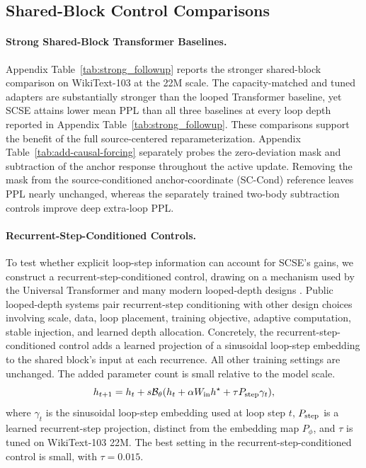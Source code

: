 \documentclass[letterpaper]{article} %
\newcommand{\SCSE}{\textsc{SCSE}}
\newcommand{\Block}{\mathcal{B}}
\theoremstyle{remark}
\begin{document}
\subsection{Shared-Block Control Comparisons}
\paragraph{Strong Shared-Block Transformer Baselines.} Appendix Table~\ref{tab:strong_followup} reports the stronger shared-block comparison on WikiText-103 at the 22M scale.  The capacity-matched and tuned adapters are substantially stronger than the looped Transformer baseline, yet \SCSE{} attains lower mean PPL than all three baselines at every loop depth reported in Appendix Table~\ref{tab:strong_followup}.  These comparisons support the benefit of the full source-centered reparameterization.  Appendix Table~\ref{tab:add-causal-forcing} separately probes the zero-deviation mask and subtraction of the anchor response throughout the active update.  Removing the mask from the source-conditioned anchor-coordinate (SC-Cond) reference leaves PPL nearly unchanged, whereas the separately trained two-body subtraction controls improve deep extra-loop PPL.

\paragraph{Recurrent-Step-Conditioned Controls.} To test whether explicit loop-step information can account for \SCSE{}'s gains, we construct a recurrent-step-conditioned control, drawing on a mechanism used by the Universal Transformer and many modern looped-depth designs \citep{dehghani2019universal,fan2025looped,geiping2025huginn,zhu2025ouro,jeddi2026loopformer,chen2026thinking}.  Public looped-depth systems pair recurrent-step conditioning with other design choices involving scale, data, loop placement, training objective, adaptive computation, stable injection, and learned depth allocation.  Concretely, the recurrent-step-conditioned control adds a learned projection of a sinusoidal loop-step embedding to the shared block's input at each recurrence.  All other training settings are unchanged.  The added parameter count is small relative to the model scale.
\begin{equation}
	h_{t+1}
	=
	h_t + s\Block_\theta(h_t+\alpha W_{\rm in}h^\star+\tau P_{\rm step}\gamma_t),
\end{equation}
where $\gamma_t$ is the sinusoidal loop-step embedding used at loop step $t$, $P_{\rm step}$ is a learned recurrent-step projection, distinct from the embedding map $P_\phi$, and $\tau$ is tuned on WikiText-103 22M.  The best setting in the recurrent-step-conditioned control is small, with $\tau=0.015$.
\end{document}
